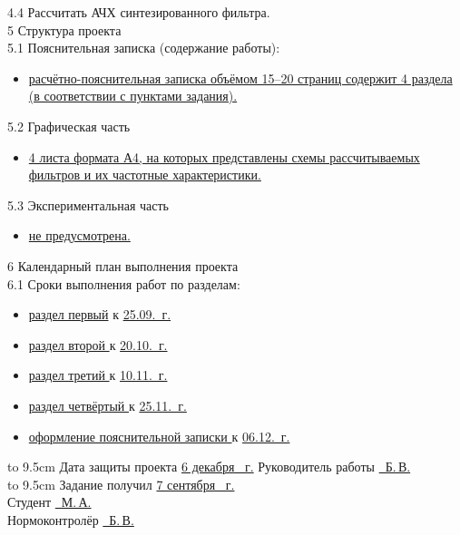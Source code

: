 4.4 Рассчитать АЧХ синтезированного фильтра.\\
5 Структура проекта\\
5.1 Пояснительная записка (содержание работы):
\begin{itemize}
\item \uline{расчётно-пояснительная записка объёмом 15--20 страниц
    со\-держит 4 раздела (в соответствии с пунктами
    задания). \hfill \quad}
\end{itemize}
5.2 Графическая часть
\begin{itemize}
\item \uline{4 листа формата А4, на которых представлены схемы
    рас\-считываемых фильтров и их частотные характеристики.\hfill}
\end{itemize}
5.3 Экспериментальная часть
\begin{itemize}
\item \uline{не предусмотрена.\hfill}
\end{itemize}
6 Календарный план выполнения проекта\\
6.1 Сроки выполнения работ по разделам:
\begin{itemize}
\item \uline{раздел первый\hfill}
  к \uline{25.09.\the\year~г. }
\item \uline{раздел второй \hfill} к \uline{20.10.\the\year~г.}
\item \uline{раздел третий \hfill} к \uline{10.11.\the\year~г.}
\item \uline{раздел четвёртый \hfill} к \uline{25.11.\the\year~г.}
\item \uline{оформление пояснительной записки \hfill} к \uline{06.12.\the\year~г.}

\end{itemize}
\hbox to 9.5cm {Дата защиты проекта \uline{\hfill 6 декабря \the\year~г.}}
Руководитель работы \uline{~Б.\,В.}\\
\hbox to 9.5cm {Задание получил \uline{\hfill7 сентября \the\year~г.}}\\
Студент    \uline{~М.\,А.}\\
Нормоконтролёр    \uline{~Б.\,В.}\\
\newpage




